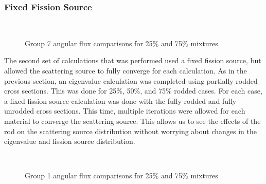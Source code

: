 \subsubsection{Fixed Fission Source}

\begin{figure}[H]
    \centering
    \hfill
    ~
    \caption{Group 7 angular flux comparisons for 25\% and 75\% mixtures}\label{f:1dmoc-angflux7}
\end{figure}

The second set of calculations that was performed used a fixed fission source, but allowed the scattering source to fully converge for each calculation.  As in the previous section, an eigenvalue calculation was completed using partially rodded cross sections.  This was done for 25\%, 50\%, and 75\% rodded cases.  For each case, a fixed fission source calculation was done with the fully rodded and fully unrodded cross sections.  This time, multiple iterations were allowed for each material to converge the scattering source.  This allows us to see the effects of the rod on the scattering source distribution without worrying about changes in the eigenvalue and fission source distribution.

\begin{figure}[H]
    \centering
    \hfill
    ~
    \caption{Group 1 angular flux comparisons for 25\% and 75\% mixtures}\label{f:1dmoc-angflux1}
\end{figure}


